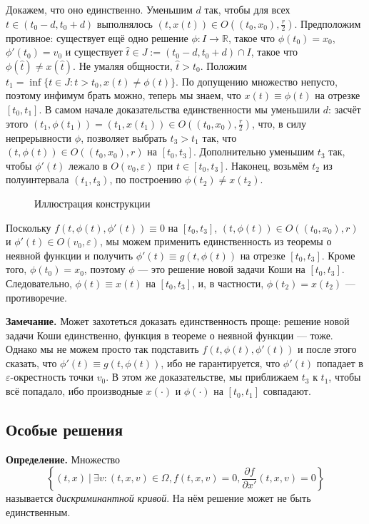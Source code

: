 Докажем, что оно единственно.
Уменьшим $d$ так, чтобы для всех $t \in (t_0 - d, t_0 + d)$ выполнялось $(t, x(t)) \in O((t_0, x_0), \frac{r}{2})$.
Предположим противное: существует ещё одно решение $\phi: I \to \mathbb R$, такое что $\phi(t_0) = x_0$, $\phi'(t_0) = v_0$ и существует $\widehat t \in J := (t_0 - d, t_0 + d) \cap I$, такое что $\phi(\widehat t) \ne x(\widehat t)$.
Не умаляя общности, $\widehat t > t_0$.
Положим $t_1 = \inf \{t \in J: t > t_0, x(t) \ne \phi(t)\}$.
По допущению множество непусто, поэтому инфимум брать можно, теперь мы знаем, что $x(t) \equiv \phi(t)$ на отрезке $[t_0, t_1]$.
В самом начале доказательства единственности мы уменьшили $d$: засчёт этого $(t_1, \phi(t_1)) = (t_1, x(t_1)) \in O((t_0, x_0), \frac{r}{2})$, что, в силу непрерывности $\phi$, позволяет выбрать $t_3 > t_1$ так, что $(t, \phi(t)) \in O((t_0, x_0), r)$ на $[t_0, t_3]$.
Дополнительно уменьшим $t_3$ так, чтобы $\phi'(t)$ лежало в $O(v_0, \varepsilon)$ при $t \in [t_0, t_3]$.
Наконец, возьмём $t_2$ из полуинтервала $(t_1, t_3)$, по построению $\phi(t_2) \ne x(t_2)$.

\begin{figure}[ht]
    \centering
    \caption{Иллюстрация конструкции}
\end{figure}

Поскольку $f(t, \phi(t), \phi'(t)) \equiv 0$ на $[t_0, t_3]$, $(t, \phi(t)) \in O((t_0, x_0), r)$ и $\phi'(t) \in O(v_0, \varepsilon)$, мы можем применить единственность из теоремы о неявной функции и получить $\phi'(t) \equiv g(t, \phi(t))$ на отрезке $[t_0, t_3]$.
Кроме того, $\phi(t_0) = x_0$, поэтому $\phi$ --- это решение новой задачи Коши на $[t_0, t_3]$.
Следовательно, $\phi(t) \equiv x(t)$ на $[t_0, t_3]$, и, в частности, $\phi(t_2) = x(t_2)$ --- противоречие.

\QED

\textbf{Замечание.} Может захотеться доказать единственность проще: решение новой задачи Коши единственно, функция в теореме о неявной функции --- тоже.
Однако мы не можем просто так подставить $f(t, \phi(t), \phi'(t))$ и после этого сказать, что $\phi'(t) \equiv g(t, \phi(t))$, ибо не гарантируется, что $\phi'(t)$ попадает в $\varepsilon$-окрестность точки $v_0$.
В этом же доказательстве, мы приближаем $t_3$ к $t_1$, чтобы всё попадало, ибо производные $x(\cdot)$ и $\phi(\cdot)$ на $[t_0, t_1]$ совпадают.

\subsection{Особые решения}
\textbf{Определение.} Множество
\[
    \left\{ (t, x)~|~\exists v: (t, x, v) \in \Omega, f(t, x, v) = 0, \frac{\partial f}{\partial x'} (t, x, v) = 0 \right\}
\]
называется \textit{дискриминантной кривой}. На нём решение может не быть единственным.

